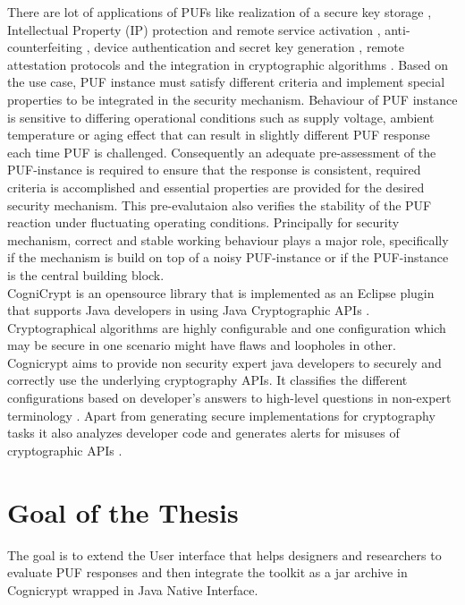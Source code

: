 There are lot of applications of PUFs like realization of a secure key storage \cite{2,3,4}, Intellectual Property (IP) protection and remote service activation \cite{5,11}, anti-counterfeiting \cite{6,7}, device authentication and secret key generation \cite{8,9,10}, remote attestation protocols \cite{12,13} and the integration in cryptographic algorithms \cite{14}. Based on the use case, PUF instance must satisfy different criteria and implement special properties to be integrated in the security mechanism. 
Behaviour of PUF instance is sensitive to differing operational conditions such as supply voltage, ambient temperature or aging effect that can result in slightly different PUF response each time PUF is challenged. \pagebreak Consequently an adequate pre-assessment of the PUF-instance is required to ensure that the response is consistent, required criteria is accomplished and essential properties are provided for the desired security mechanism. This pre-evalutaion also verifies the stability of the PUF reaction under fluctuating operating conditions. Principally for security mechanism, correct and stable working behaviour plays a major role, specifically if the mechanism is build on top of a noisy PUF-instance or if the PUF-instance is the central building block.\\

CogniCrypt is an opensource library that is implemented as an Eclipse plugin that supports Java developers in using Java Cryptographic APIs \cite{cogni}. Cryptographical algorithms are highly configurable and one configuration which may be secure in one scenario might have flaws and loopholes in other. Cognicrypt aims to provide non security expert java developers to securely and correctly use the underlying cryptography APIs. 
It classifies the different configurations based on developer's answers to high-level questions in non-expert terminology \cite{onward2015}. Apart from generating secure implementations for cryptography tasks it also analyzes developer code and generates alerts for misuses of cryptographic APIs \cite{cogni}. 


\section{Goal of the Thesis}
The goal is to extend the User interface that helps designers and researchers to evaluate PUF responses  and then integrate the toolkit as a jar archive in Cognicrypt wrapped in Java Native Interface.

